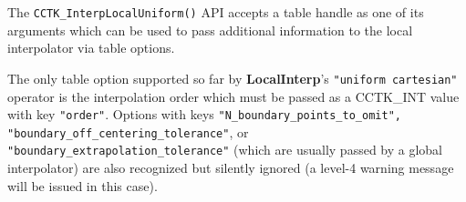 The \verb|CCTK_InterpLocalUniform()| API accepts a table handle as one of its
arguments which can be used to pass additional information to the local
interpolator via table options.

The only table option supported so far by {\bf LocalInterp}'s {\tt "uniform
cartesian"} operator is the interpolation order which must be
passed as a CCTK\_INT value with key {\tt "order"}. Options with keys
{\tt "N\_boundary\_points\_to\_omit", "boundary\_off\_centering\_tolerance"}, or
{\tt "boundary\_extrapolation\_tolerance"} (which are usually passed by a
global interpolator) are also recognized but silently ignored (a level-4 warning
message will be issued in this case).




